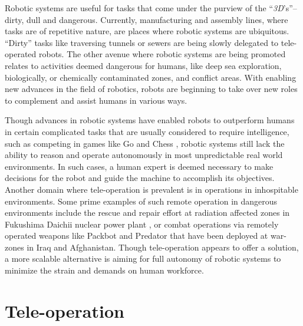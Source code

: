 \documentclass {udthesis}
\begin{document}
Robotic systems are useful for tasks that come under the purview of the ``\emph{3D}'s''--dirty, dull and dangerous. 
Currently, manufacturing and assembly lines, where tasks are of repetitive nature, are places where robotic systems are ubiquitous. ``Dirty'' tasks like traversing tunnels or sewers are being slowly delegated to tele-operated robots. 
The other avenue where robotic systems are being promoted relates to activities deemed dangerous for humans, like deep sea exploration, biologically, or chemically contaminated zones, and conflict areas. With enabling new advances in the field of robotics, robots are beginning to take over new roles to complement and assist humans in various ways.

Though advances in robotic systems have enabled robots to outperform humans in certain complicated tasks that are usually considered to require intelligence, such as competing in games like Go \cite{deepmind} and Chess \cite{deepblue}, 
robotic systems still lack the ability to reason and operate
autonomously in most unpredictable real world environments. 
In such cases, a human expert is deemed necessary to make decisions for the robot and guide the machine
to accomplish its objectives. Another domain where tele-operation is prevalent is in operations in inhospitable environments. Some prime examples of such remote operation in
dangerous environments include the rescue and repair effort at radiation affected zones in Fukushima Daichii nuclear power plant \cite{fukushima}, or combat operations via remotely operated weapons like Packbot \cite{packbot} and Predator \cite{predator} that have been deployed
at war-zones in Iraq and Afghanistan. Though tele-operation appears to offer a solution, a more scalable alternative
is aiming for full autonomy of robotic systems to minimize the strain and demands on human workforce.

\section{Tele-operation}
\end{document}
